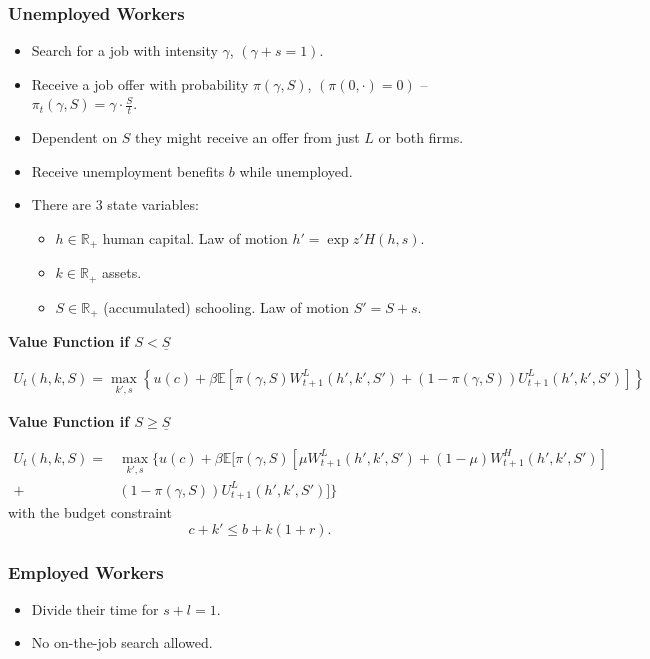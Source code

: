 \subsubsection{Unemployed Workers}
\begin{itemize}
    \item Search for a job with intensity $\gamma$, $(\gamma + s = 1)$.
    \item Receive a job offer with probability $\pi(\gamma, S)$, $(\pi(0,\cdot) = 0)$ -- $ \pi_t(\gamma, S) = \gamma \cdot \frac{S}{t} $.
    \item Dependent on $S$ they might receive an offer from just $L$ or both firms.
    \item Receive unemployment benefits $b$ while unemployed.
    
    \item There are $3$ state variables:
    \begin{itemize}
    	\item $h \in \mathbb{R}_+$ human capital. Law of motion $ h' = \exp{z'} H(h,s) $.
    	\item $k \in \mathbb{R}_+$ assets.
    	\item $S \in \mathbb{R}_+$ (accumulated) schooling. Law of motion $ S' = S + s $.
    \end{itemize}
\end{itemize}

\textbf{Value Function if $S < \underline{S}$}

\begin{align*}
    U_t(h,k,S) =  \max_{k',s} \left\{ u(c) + \beta\mathbb{E}\left[\pi(\gamma, S)W^L_{t+1}(h',k',S')
    + (1 - \pi(\gamma, S))U^L_{t+1}(h',k',S')  \right] \right\}
\end{align*}


\textbf{Value Function if $S \geq \underline{S}$}

\begin{align*}
	U_t(h,k,S) = &  \max_{k',s} \biggl\{ u(c) + \beta\mathbb{E}\biggl[\pi(\gamma, S) \left[\mu W^L_{t+1}(h',k',S') + (1 - \mu) W^H_{t+1}(h',k',S') \right]  \\
		+ & (1 - \pi(\gamma, S)) U^L_{t+1}(h',k',S')  \biggr] \biggr\}
\end{align*}
with the budget constraint \[  c + k' \leq b + k(1+r). \]

\subsubsection{Employed Workers}
\begin{itemize}
	\item Divide their time for $ s + l = 1 $.
	\item No on-the-job search allowed.
\end{itemize}

